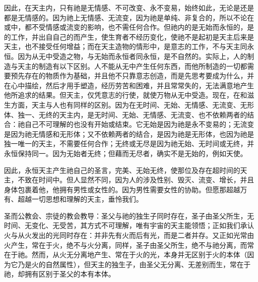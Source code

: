 因此，在天主内，只有祂是无情感、不可改变、永不变易，始终如此，无论是还是都是无情感的。因为祂上无情感、无流变，因为祂是单纯、非复合的，所以不论在或中，都不受情感或流变的影响，也不需任何合作。但祂内的是无始而永恒的，是的工作，并出自自己的而产生，使生育者不经历变化，使祂不是起初是天主后来是天主，也不接受任何增益；而在天主造物的情形中，是意志的工作，不与天主同永恒。因为从无中受造之物，与无始而永恒者同永恒，是不自然的。实际上，人的制造与天主的制造有以下区别。人不能从无中产生任何东西，而他所制造的一切都需要预先存在的物质作为基础，并且他不只靠意志创造，而是先思考要成为什么，并在心中描绘，然后才用手塑造，经历劳苦和困难，并且常常失的，无法满意地产生他所追求的结果。但天主，仅凭意志的行使，就使万物从无中受造。现在，在和滋生方面，天主与人也有同样的区别。因为在无时间、无始、无情感、无流变、无形体、独一、无终的天主内，是无时间、无始、无情感、无流变、也不依赖两者的结合：祂自己不可理解的也没有开始或结束。它无始是因为祂是永不变易的；无流变是因为祂无情感和无形体；又不依赖两者的结合，是因为祂是无形体，也因为祂是独一唯一的天主，不需要任何合作；无终或无尽是因为祂无始、无时间或无终，并永恒保持同一。因为无始者无终；但藉而无尽者，确实不是无始的，例如天使。\par

因此，永恒天主产生祂自己的圣言，完美、无始无终，使那位及存在超时间的天主，不致在时间中。但人显然不同，因为人的涉及性别、毁灭、流变、增长，并且身体包裹着他，他拥有男性或女性的。因为男性需要女性的协助。但愿那超越万有、超越一切思想和理解的天主，垂怜我们。\par

圣而公教会、宗徒的教会教导：圣父与祂的独生子同时存在，圣子由圣父所生，无时间、无变化、无受苦，其方式不可理解，唯有宇宙的天主能领悟；正如我们承认火与从火发出的光同时存在：并非先有火而后有光，而是二者并存。又正如光常由火产生，常在于火，绝不与火分离，同样，圣子由圣父所生，绝不与祂分离，而常在于祂。然而，从火无分离地产生、常在于火的光，本身并无区别于火的本体（因为它乃是火的自然属性），但天主的独生子，由圣父无分离、无差别而生，常在于祂，却拥有区别于圣父的本有本体。\par

